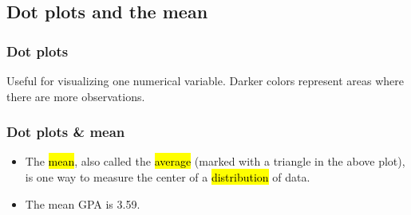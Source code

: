 \documentclass[slidestop,compress,mathserif]{beamer}
\begin{document}

\subsection{Dot plots and the mean}


\begin{frame}
\frametitle{Dot plots}

Useful for visualizing one numerical variable. Darker colors represent areas where there are more observations.

\begin{center}
\end{center}


\end{frame}



\begin{frame}
\frametitle{Dot plots \& mean}

\begin{center}
\end{center}

\begin{itemize}

\item The \hl{mean}, also called the \hl{average} (marked with a triangle in the above plot), is one way to measure the center of a \hl{distribution} of data.

\item The mean GPA is 3.59.

\end{itemize} 

\end{frame}

\end{document}
